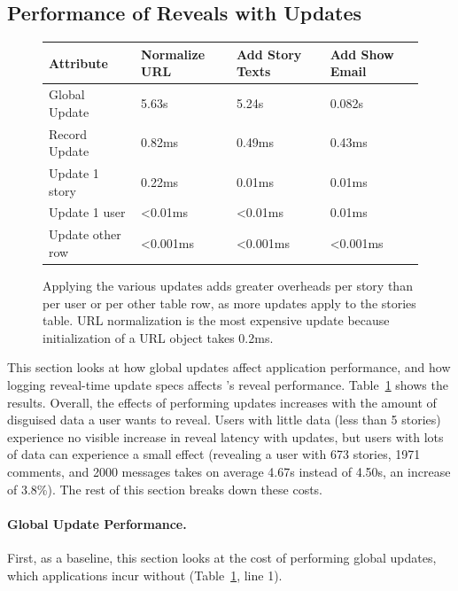 \subsection{Performance of Reveals with Updates}
\label{s:eval:updates}

\begin{figure}
    \centering
    \begin{tabular}{m{}|m{}|m{}|m{}}
        \centering\textbf{Attribute} & \textbf{Normalize URL} & \textbf{Add Story Texts} &
        \textbf{Add Show Email} \\
        \hline
        Global Update & 5.63s & 5.24s & 0.082s\\
        \hline
        Record Update & 0.82ms & 0.49ms & 0.43ms \\
        \hline
        Update 1 story & 0.22ms & 0.01ms & 0.01ms \\
        \hline
        Update 1 user & <0.01ms & <0.01ms & 0.01ms \\
        \hline
        Update other row & <0.001ms & <0.001ms & <0.001ms \\
    \end{tabular}
    \caption[Overheads of global updates and reveal-time updates.]{Applying the various updates adds greater overheads per story than
    per user or per other table row, as more updates apply to the stories table.
    URL normalization is the most expensive update because initialization of a
    URL object takes 0.2ms.}
    \label{tab:updates-perf}
\end{figure}

This section looks at how global updates affect application performance, and how
logging reveal-time update specs affects \sys's reveal performance.
Table~\ref{tab:updates-perf} shows the results.
%
Overall, the effects of performing updates increases with the amount of
disguised data a user wants to reveal.
%
Users with little data (\eg less than 5 stories) experience no visible increase
in reveal latency with updates, but users with lots of data can experience a
small effect (\eg revealing a user with 673 stories, 1971 comments, and 2000
messages takes on average 4.67s instead of 4.50s, an increase of 3.8\%).
%
The rest of this section breaks down these costs.
%

\paragraph{Global Update Performance.}
First, as a baseline, this section looks at the cost of performing
global updates, which
applications incur without \sys (Table~\ref{tab:updates-perf}, line 1).
%

